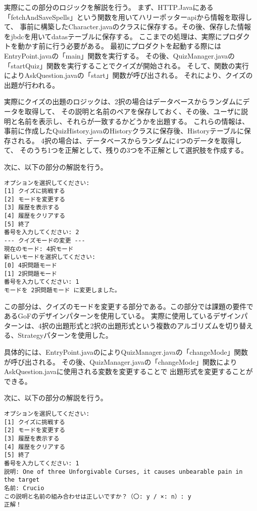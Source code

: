 \documentclass[uplatex,dvipdfmx,a4paper]{jsarticle}
\begin{document}
\par 実際にこの部分のロジックを解説を行う。
まず、HTTP.Javaにある「fetchAndSaveSpells」という関数を用いてハリーポッターapiから情報を取得して、
事前に構築したCharacter.javaのクラスに保存する。その後、保存した情報をjbdcを用いてdatasテーブルに保存する。
ここまでの処理は、実際にプロダクトを動かす前に行う必要がある。
最初にプロダクトを起動する際にはEntryPoint.javaの「main」関数を実行する。
その後、QuizManager.javaの「startQuiz」関数を実行することでクイズが開始される。
そして、関数の実行によりAskQuestion.javaの「start」関数が呼び出される。
それにより、クイズの出題が行われる。
\par 実際にクイズの出題のロジックは、2択の場合はデータベースからランダムにデータを取得して、
その説明と名前のペアを保存しておく、その後、ユーザに説明と名前を表示し、それらが一致するかどうかを出題する。
これらの情報は、事前に作成したQuizHistory.javaのHistoryクラスに保存後、Historyテーブルに保存される。 4択の場合は、データベースからランダムに4つのデータを取得して、
そのうち1つを正解として、残りの3つを不正解として選択肢を作成する。
\par 次に、以下の部分の解説を行う。
\begin{lstlisting}[style=result]
オプションを選択してください:
[1] クイズに挑戦する
[2] モードを変更する
[3] 履歴を表示する
[4] 履歴をクリアする
[5] 終了
番号を入力してください: 2
--- クイズモードの変更 ---
現在のモード: 4択モード
新しいモードを選択してください:
[0] 4択問題モード
[1] 2択問題モード
番号を入力してください: 1
モードを 2択問題モード に変更しました。  
\end{lstlisting}
\par この部分は、クイズのモードを変更する部分である。この部分では課題の要件であるGoFのデザインパターンを使用している。
実際に使用しているデザインパターンは、4択の出題形式と2択の出題形式という複数のアルゴリズムを切り替える、Strategyパターンを使用した。
\par 具体的には、EntryPoint.javaのによりQuizManager.javaの「changeMode」関数が呼び出される。
その後、QuizManager.javaの「changeMode」関数によりAskQuestion.javaに使用される変数を変更することで
出題形式を変更することができる。
\par 次に、以下の部分の解説を行う。
\begin{lstlisting}[style=result]
  オプションを選択してください:
[1] クイズに挑戦する
[2] モードを変更する
[3] 履歴を表示する
[4] 履歴をクリアする
[5] 終了
番号を入力してください: 1
説明: One of three Unforgivable Curses, it causes unbearable pain in the target
名前: Crucio
この説明と名前の組み合わせは正しいですか？（〇: y / ×: n）: y
正解！
\end{lstlisting}
\end{document}

